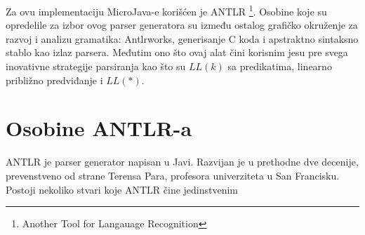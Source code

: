 Za ovu implementaciju MicroJava-e korišćen je ANTLR
\footnote{\skr \eng Another Tool for Langauage Recognition}.
Osobine koje su opredelile za izbor ovog parser generatora su između ostalog grafičko okruženje za razvoj i analizu gramatika: Antlrworks, generisanje C koda i apstraktno sintaksno stablo kao izlaz parsera.
Međutim ono što ovaj alat čini korisnim jesu pre svega inovativne strategije parsiranja kao što su $LL(k)$ sa predikatima\cite{pred-llk}, linearno približno predviđanje\cite{parr-thesis} i $LL(*)$\cite{ll*}.

\section{Osobine ANTLR-a}

ANTLR je parser generator napisan u Javi. 
Razvijan je u prethodne dve decenije, prevenstveno od strane Terensa Para, profesora univerziteta u San Francisku.
Postoji nekoliko stvari koje ANTLR čine jedinstvenim
